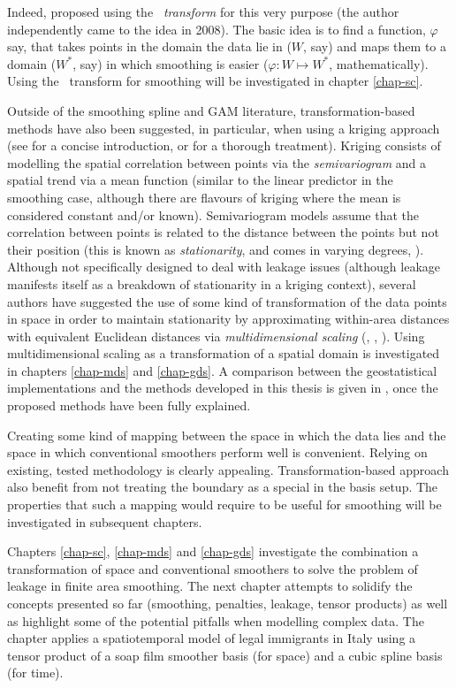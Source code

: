 \begin{enumerate}
Indeed,  proposed using the \textit{\sch\ transform} for this very purpose (the author independently came to the idea in 2008). The basic idea is to find a function, $\varphi$ say, that takes points in the domain the data lie in ($W$, say) and maps them to a domain ($W^*$, say) in which smoothing is easier ($\varphi : W \mapsto W^*$, mathematically). Using the \sch\ transform for smoothing will be investigated in chapter \ref{chap-sc}.

Outside of the smoothing spline and GAM literature, transformation-based methods have also been suggested, in particular, when using a kriging approach (see \cite[pp. 425-430]{MASS} for a concise introduction, \cite{schabenberger} or \cite{diggle} for a thorough treatment). Kriging consists of modelling the spatial correlation between points via the \textit{semivariogram} and a spatial trend via a mean function (similar to the linear predictor in the smoothing case, although there are flavours of kriging where the mean is considered constant and/or known). Semivariogram models assume that the correlation between points is related to the distance between the points but not their position (this is known as \textit{stationarity}, and comes in varying degrees, \cite[pp. 42-44]{schabenberger}). Although not specifically designed to deal with leakage issues (although leakage manifests itself as a breakdown of stationarity in a kriging context), several authors have suggested the use of some kind of transformation of the data points in space in order to maintain stationarity by approximating within-area distances with equivalent Euclidean distances  via \textit{multidimensional scaling} (\cite{mdskrig}, \cite{crabkrig}, \cite{curriero}). Using multidimensional scaling as a transformation of a spatial domain is investigated in chapters  \ref{chap-mds} and \ref{chap-gds}. A comparison between the geostatistical implementations and the methods developed in this thesis is given in , once the proposed methods have been fully explained.
\end{enumerate}

Creating some kind of mapping between the space in which the data lies and the space in which conventional smoothers perform well is convenient. Relying on existing, tested methodology is clearly appealing. Transformation-based approach also benefit from not treating the boundary as a special in the basis setup. The properties that such a mapping would require to be useful for smoothing will be investigated in subsequent chapters.

Chapters \ref{chap-sc}, \ref{chap-mds} and \ref{chap-gds} investigate the combination a transformation of space and conventional smoothers to solve the problem of leakage in finite area smoothing. The next chapter attempts to solidify the concepts presented so far (smoothing, penalties, leakage, tensor products) as well as highlight some of the potential pitfalls when modelling complex data. The chapter applies a spatiotemporal model of legal immigrants in Italy using a tensor product of a soap film smoother basis (for space) and a cubic spline basis (for time).
